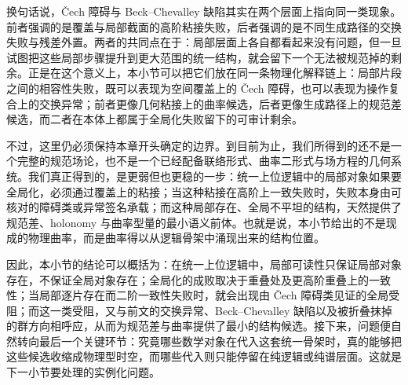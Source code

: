 换句话说，Čech 障碍与 Beck--Chevalley 缺陷其实在两个层面上指向同一类现象。前者强调的是覆盖与局部截面的高阶粘接失败，后者强调的是不同生成路径的交换失败与残差外置。两者的共同点在于：局部层面上各自都看起来没有问题，但一旦试图把这些局部步骤提升到更大范围的统一结构，就会留下一个无法被规范掉的剩余。正是在这个意义上，本小节可以把它们放在同一条物理化解释链上：局部片段之间的相容性失败，既可以表现为空间覆盖上的 Čech 障碍，也可以表现为操作复合上的交换异常；前者更像几何粘接上的曲率候选，后者更像生成路径上的规范差候选，而二者在本体上都属于全局化失败留下的可审计剩余。

不过，这里仍必须保持本章开头确定的边界。到目前为止，我们所得到的还不是一个完整的规范场论，也不是一个已经配备联络形式、曲率二形式与场方程的几何系统。我们真正得到的，是更弱但也更稳的一步：统一上位逻辑中的局部对象如果要全局化，必须通过覆盖上的粘接；当这种粘接在高阶上一致失败时，失败本身由可核对的障碍类或异常签名承载；而这种局部存在、全局不平坦的结构，天然提供了规范差、holonomy 与曲率型量的最小语义前体。也就是说，本小节给出的不是现成的物理曲率，而是曲率得以从逻辑骨架中涌现出来的结构位置。

因此，本小节的结论可以概括为：在统一上位逻辑中，局部可读性只保证局部对象存在，不保证全局对象存在；全局化的成败取决于重叠处及更高阶重叠上的一致性；当局部逐片存在而二阶一致性失败时，就会出现由 Čech 障碍类见证的全局受阻；而这一类受阻，又与前文的交换异常、Beck--Chevalley 缺陷以及被折叠抹掉的群方向相呼应，从而为规范差与曲率提供了最小的结构候选。接下来，问题便自然转向最后一个关键环节：究竟哪些数学对象在代入这套统一骨架时，真的能够把这些候选收缩成物理型时空，而哪些代入则只能停留在纯逻辑或纯谱层面。这就是下一小节要处理的实例化问题。
